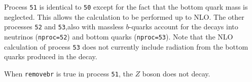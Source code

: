 \label{subsec:zbbmassless}

Process {\tt 51} is identical to {\tt 50} except for the fact
that the bottom quark mass is neglected. This allows the calculation to be
performed up to NLO. The other processes {\tt 52} and {\tt 53},also with massless $b$-quarks
account for the decays into
neutrinos ({\tt nproc=52}) and bottom quarks ({\tt nproc=53}). Note that
the NLO calculation of process {\tt 53} does not currently
include radiation from the
bottom quarks produced in the decay.

When {\tt removebr} is true in process {\tt 51}, the $Z$ boson does not decay.
